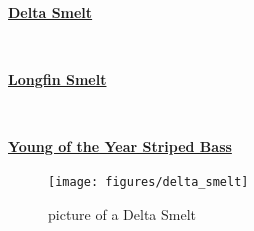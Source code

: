 \documentclass[
]{book}
\begin{document}
\begin{panel-grid}

\begin{columns-nocenter}

\begin{column800}

\textbf{\href{http://calfish.ucdavis.edu/species/?uid=47\&ds=698}{Delta Smelt}}

\end{column800}

\begin{column40}

~

\end{column40}

\begin{column800}

\textbf{\href{http://calfish.ucdavis.edu/species/?uid=87\&ds=698}{Longfin Smelt}}

\end{column800}

\begin{column40}

~

\end{column40}

\begin{column800}

\textbf{\href{http://calfish.ucdavis.edu/species/?uid=160\&ds=698}{Young of the Year Striped Bass}}

\end{column800}

\end{columns-nocenter}

\begin{columns-nocenter}

\begin{column800}

\begin{figure}

{\centering \texttt{[image: figures/delta\_smelt]} 

}

\caption{picture of a Delta Smelt}\label{fig:unnamed-chunk-121}
\end{figure}

\end{column800}

\begin{column40}

~

\end{column40}


\end{columns-nocenter}
\end{panel-grid}
\end{document}

